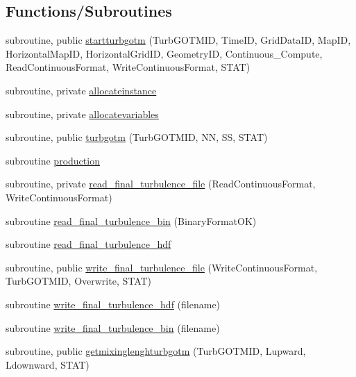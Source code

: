 \subsection*{Functions/\+Subroutines}
\begin{DoxyCompactItemize}
\item 
subroutine, public \mbox{\hyperlink{namespacemoduleturbgotm_ade6cfc34dc78769397885a40df0e608b}{startturbgotm}} (Turb\+G\+O\+T\+M\+ID, Time\+ID, Grid\+Data\+ID, Map\+ID, Horizontal\+Map\+ID, Horizontal\+Grid\+ID, Geometry\+ID, Continuous\+\_\+\+Compute, Read\+Continuous\+Format, Write\+Continuous\+Format, S\+T\+AT)
\item 
subroutine, private \mbox{\hyperlink{namespacemoduleturbgotm_a1f367dad0fd7a9dba96b5da89226bfdb}{allocateinstance}}
\item 
subroutine, private \mbox{\hyperlink{namespacemoduleturbgotm_ad863a5918db79e19552388fff6750b22}{allocatevariables}}
\item 
subroutine, public \mbox{\hyperlink{namespacemoduleturbgotm_ab0d8f0e83e75ef88108e4b2bf04543c0}{turbgotm}} (Turb\+G\+O\+T\+M\+ID, NN, SS, S\+T\+AT)
\item 
subroutine \mbox{\hyperlink{namespacemoduleturbgotm_a67c6b885be20c57ed033df6706d9adab}{production}}
\item 
subroutine, private \mbox{\hyperlink{namespacemoduleturbgotm_afb5ea6833bc3fb9e5ef6bc373e92a305}{read\+\_\+final\+\_\+turbulence\+\_\+file}} (Read\+Continuous\+Format, Write\+Continuous\+Format)
\item 
subroutine \mbox{\hyperlink{namespacemoduleturbgotm_ad942836f5c266b4ce7d03ca96fdf696a}{read\+\_\+final\+\_\+turbulence\+\_\+bin}} (Binary\+Format\+OK)
\item 
subroutine \mbox{\hyperlink{namespacemoduleturbgotm_a8389365bd5c5c531982068da1e23ce6f}{read\+\_\+final\+\_\+turbulence\+\_\+hdf}}
\item 
subroutine, public \mbox{\hyperlink{namespacemoduleturbgotm_a01feda969236095bbd86a65a94f4e37c}{write\+\_\+final\+\_\+turbulence\+\_\+file}} (Write\+Continuous\+Format, Turb\+G\+O\+T\+M\+ID, Overwrite, S\+T\+AT)
\item 
subroutine \mbox{\hyperlink{namespacemoduleturbgotm_afdd63df0733f254a488fb73b240eb944}{write\+\_\+final\+\_\+turbulence\+\_\+hdf}} (filename)
\item 
subroutine \mbox{\hyperlink{namespacemoduleturbgotm_a471003d8ec76b83e26d91b8ed4815546}{write\+\_\+final\+\_\+turbulence\+\_\+bin}} (filename)
\item 
subroutine, public \mbox{\hyperlink{namespacemoduleturbgotm_a6d3261fc0b6cba6819262e7f8ce2b140}{getmixinglenghturbgotm}} (Turb\+G\+O\+T\+M\+ID, Lupward, Ldownward, S\+T\+AT)

\end{DoxyCompactItemize}
